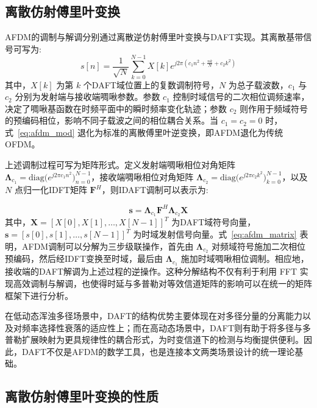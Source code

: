\subsection{离散仿射傅里叶变换}

AFDM的调制与解调分别通过离散逆仿射傅里叶变换与DAFT实现。其离散基带信号可写为:
\begin{equation}
    s[n] = \frac{1}{\sqrt{N}} \sum_{k=0}^{N-1} X[k] e^{j 2 \pi (c_1 n^2 + \frac{nk}{N} + c_2 k^2)}
\label{eq:afdm_mod}
\end{equation}
其中，$X[k]$ 为第 $k$ 个DAFT域位置上的复数调制符号，$N$ 为总子载波数，$c_1$ 与 $c_2$ 分别为发射端与接收端啁啾参数。参数 $c_1$ 控制时域信号的二次相位调频速率，决定了啁啾基函数在时频平面中的瞬时频率变化轨迹；参数 $c_2$ 则作用于频域符号的预编码相位，影响不同子载波之间的相位耦合关系。当 $c_1 = c_2 = 0$ 时，式~\eqref{eq:afdm_mod} 退化为标准的离散傅里叶逆变换，即AFDM退化为传统OFDM。

上述调制过程可写为矩阵形式。定义发射端啁啾相位对角矩阵 $\boldsymbol{\Lambda}_{c_1} = \mathrm{diag}\!\bigl(e^{j2\pi c_1 n^2}\bigr)_{n=0}^{N-1}$，接收端啁啾相位对角矩阵 $\boldsymbol{\Lambda}_{c_2} = \mathrm{diag}\!\bigl(e^{j2\pi c_2 k^2}\bigr)_{k=0}^{N-1}$，以及 $N$ 点归一化IDFT矩阵 $\mathbf{F}^{H}$，则IDAFT调制可以表示为:

\begin{equation}
    \mathbf{s} = \boldsymbol{\Lambda}_{c_1} \mathbf{F}^{H} \boldsymbol{\Lambda}_{c_2} \mathbf{X}
\label{eq:afdm_matrix}
\end{equation}
其中，$\mathbf{X} = [X[0], X[1], \ldots, X[N-1]]^{T}$ 为DAFT域符号向量，$\mathbf{s} = [s[0], s[1], \ldots, s[N-1]]^{T}$ 为时域发射信号向量。式~\eqref{eq:afdm_matrix} 表明，AFDM调制可以分解为三步级联操作，首先由 $\boldsymbol{\Lambda}_{c_2}$ 对频域符号施加二次相位预编码，然后经IDFT变换至时域，最后由 $\boldsymbol{\Lambda}_{c_1}$ 施加时域啁啾相位调制。相应地，接收端的DAFT解调为上述过程的逆操作。这种分解结构不仅有利于利用 FFT 实现高效调制与解调，也使得时延与多普勒对等效信道矩阵的影响可以在统一的矩阵框架下进行分析。

在低动态浑浊多径场景中，DAFT的结构优势主要体现在对多径分量的分离能力以及对频率选择性衰落的适应性上；而在高动态场景中，DAFT则有助于将多径与多普勒扩展映射为更具规律性的耦合形式，为时变信道下的检测与均衡提供便利。因此，DAFT不仅是AFDM的数学工具，也是连接本文两类场景设计的统一理论基础。

\subsection{离散仿射傅里叶变换的性质}
\label{subsec:daft_shift_properties}

